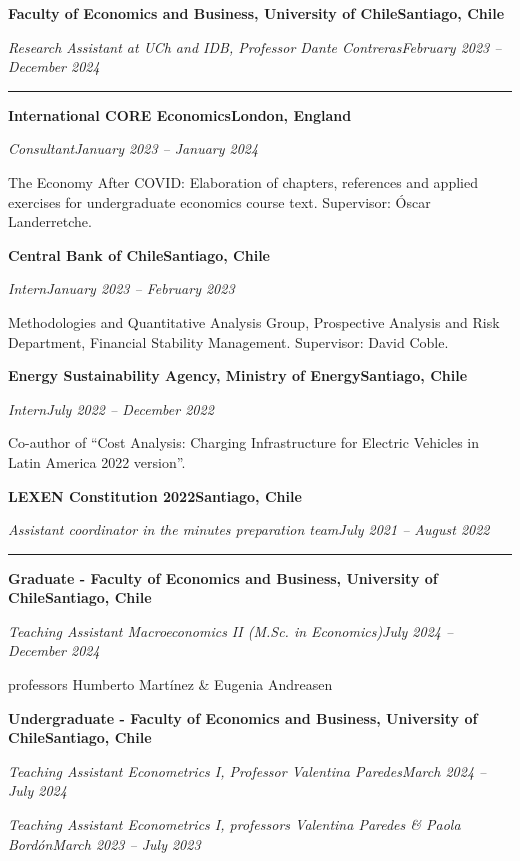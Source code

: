\documentclass[11pt]{article}
\newcommand{\cvsection}[1]{\vspace{9pt}{\bfseries #1}\par\vspace{2pt}\hrule\vspace{6pt}}
\newcommand{\HL}[2]{\textbf{#1}\hfill\textbf{#2}\par}
\newcommand{\RL}[2]{\textit{#1}\hfill\textit{#2}\par}
\newcommand{\gap}{\vspace{7pt}}
\begin{document}
\HL{Faculty of Economics and Business, University of Chile}{Santiago, Chile}
\RL{Research Assistant at UCh and IDB, Professor Dante Contreras}{February 2023 -- December 2024}

\cvsection{OTHER EXPERIENCE}

\HL{International CORE Economics}{London, England}
\RL{Consultant}{January 2023 -- January 2024}
\begin{cvitems}
  \item The Economy After COVID: Elaboration of chapters, references and applied exercises for undergraduate economics course text. Supervisor: Óscar Landerretche.
\end{cvitems}
\gap

\HL{Central Bank of Chile}{Santiago, Chile}
\RL{Intern}{January 2023 -- February 2023}
\begin{cvitems}
  \item Methodologies and Quantitative Analysis Group, Prospective Analysis and Risk Department, Financial Stability Management. Supervisor: David Coble.
\end{cvitems}
\gap

\HL{Energy Sustainability Agency, Ministry of Energy}{Santiago, Chile}
\RL{Intern}{July 2022 -- December 2022}
\begin{cvitems}
  \item Co-author of ``Cost Analysis: Charging Infrastructure for Electric Vehicles in Latin America 2022 version''.
\end{cvitems}
\gap

\HL{LEXEN Constitution 2022}{Santiago, Chile}
\RL{Assistant coordinator in the minutes preparation team}{July 2021 -- August 2022}

\cvsection{TEACHING EXPERIENCE}

\HL{Graduate - Faculty of Economics and Business, University of Chile}{Santiago, Chile}
\RL{Teaching Assistant Macroeconomics II (M.Sc. in Economics)}{July 2024 -- December 2024}
professors Humberto Martínez \& Eugenia Andreasen
\gap

\HL{Undergraduate - Faculty of Economics and Business, University of Chile}{Santiago, Chile}
\gap

\RL{Teaching Assistant Econometrics I, Professor Valentina Paredes}{March 2024 -- July 2024}
\gap

\RL{Teaching Assistant Econometrics I, professors Valentina Paredes \& Paola Bordón}{March 2023 -- July 2023}
\gap
\end{document}
